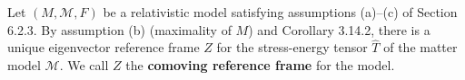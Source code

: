 Let $(M, \mathcal{M}, F)$ be a relativistic model satisfying assumptions (a)--(c) of Section 6.2.3. By assumption (b) (maximality of $M$) and Corollary 3.14.2, there is a unique eigenvector reference frame $Z$ for the stress-energy tensor $\hat{T}$ of the matter model $\mathcal{M}$. We call $Z$ the \textbf{comoving reference frame} for the model.
